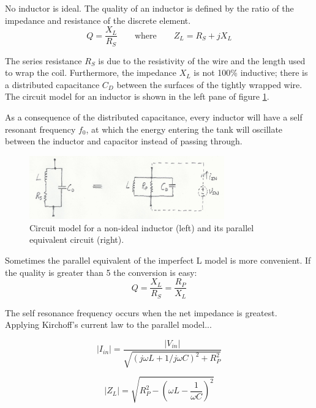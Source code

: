 \documentclass[titlepage, letterpaper, 11pt]{article}
\begin{document}
No inductor is ideal. The quality of an inductor is defined by
the ratio of the impedance and resistance of the discrete element.
\begin{equation*}
Q=\frac{X_{L}}{R_{S}}\qquad\textrm{where}\qquad Z_{L}=R_{S}+jX_{L}
\end{equation*}

The series resistance $R_{S}$ is due to the resistivity of the
wire and the length used to wrap the coil. Furthermore, the
impedance $X_{L}$ is not 100\% inductive; there is a distributed
capacitance $C_{D}$ between the surfaces of the tightly wrapped
wire. The circuit model for an inductor is shown in the left pane of
figure \ref{tankCircuit}.

As a consequence of the distributed capacitance, every inductor
will have a self resonant frequency $f_{0}$, at which the energy
entering the tank will oscillate between the inductor and capacitor
instead of passing through.

\begin{figure}[ht]
	\centering
	\includegraphics[width=0.75\textwidth]
		{figures/tankCircuit.png}
	\caption{
		Circuit model for a non-ideal inductor (left) and its
		parallel equivalent circuit (right).
	}
	\label{tankCircuit}
\end{figure}

Sometimes the parallel equivalent of the imperfect L model is more
convenient. If the quality is greater than 5 the conversion is easy:
\begin{equation}
Q=\frac{X_{L}}{R_{S}}=\frac{R_{P}}{X_{L}}
\end{equation}

The self resonance frequency occurs when the net impedance is
greatest. Applying Kirchoff's current law to the parallel model...

\begin{equation*}
|I_{in}|=\frac{|V_{in}|}
{\sqrt{(j\omega L+1/j\omega C)^{2}+R_{P}^{2}}}
\end{equation*}

\begin{equation}
|Z_{L}|=\sqrt{R_{P}^{2}-\left(\omega L-\frac{1}{\omega C}\right)^{2}}
\end{equation}
\end{document}
